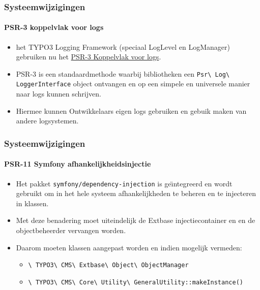 
\begin{frame}[fragile]
	\frametitle{Systeemwijzigingen}
	\framesubtitle{PSR-3 koppelvlak voor logs}

	\begin{itemize}
		\item het TYPO3 Logging Framework (speciaal LogLevel en LogManager) gebruiken nu het
			\href{https://www.php-fig.org/psr/psr-3/}{PSR-3 Koppelvlak voor logs}.

		\item PSR-3 is een standaardmethode waarbij bibliotheken een
			\texttt{Psr\textbackslash
				Log\textbackslash
				LoggerInterface} object ontvangen en op een simpele en universele manier
				naar logs kunnen schrijven.

			\item Hiermee kunnen Ontwikkelaars eigen logs gebruiken en gebuik maken van
				andere logsystemen.

	\end{itemize}

\end{frame}


\begin{frame}[fragile]
	\frametitle{Systeemwijzigingen}
	\framesubtitle{PSR-11 Symfony afhankelijkheidsinjectie}

	\begin{itemize}
		\item Het pakket \texttt{symfony/dependency-injection} is ge\"{\i}ntegreerd
			en wordt gebruikt om in het hele systeem afhankelijkheden te beheren en
			te injecteren in klassen.

		\item Met deze benadering moet uiteindelijk de Extbase injectiecontainer en
			en de objectbeheerder vervangen worden.

		\item Daarom moeten klassen aangepast worden en indien mogelijk vermeden:

			\begin{itemize}\small
				\item \texttt{\textbackslash
					TYPO3\textbackslash
					CMS\textbackslash
					Extbase\textbackslash
					Object\textbackslash
					ObjectManager}
				\item \texttt{\textbackslash
					TYPO3\textbackslash
					CMS\textbackslash
					Core\textbackslash
					Utility\textbackslash
					GeneralUtility::makeInstance()}
			\end{itemize}\normalsize

	\end{itemize}

\end{frame}

